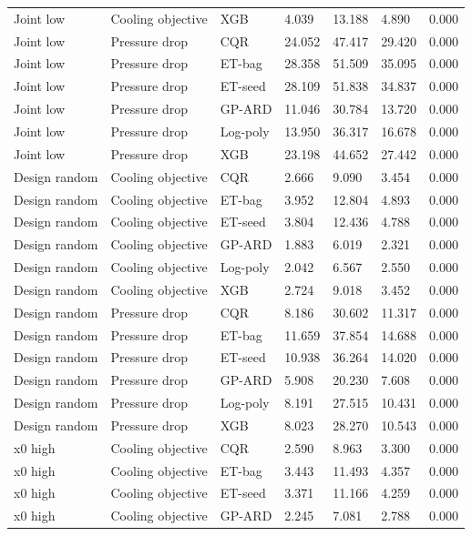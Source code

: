 \begin{longtable}{lllllll}
Joint low & Cooling objective & XGB & 4.039 & 13.188 & 4.890 & 0.000\\
Joint low & Pressure drop & CQR & 24.052 & 47.417 & 29.420 & 0.000\\
Joint low & Pressure drop & ET-bag & 28.358 & 51.509 & 35.095 & 0.000\\
Joint low & Pressure drop & ET-seed & 28.109 & 51.838 & 34.837 & 0.000\\
Joint low & Pressure drop & GP-ARD & 11.046 & 30.784 & 13.720 & 0.000\\
Joint low & Pressure drop & Log-poly & 13.950 & 36.317 & 16.678 & 0.000\\
Joint low & Pressure drop & XGB & 23.198 & 44.652 & 27.442 & 0.000\\
Design random & Cooling objective & CQR & 2.666 & 9.090 & 3.454 & 0.000\\
Design random & Cooling objective & ET-bag & 3.952 & 12.804 & 4.893 & 0.000\\
Design random & Cooling objective & ET-seed & 3.804 & 12.436 & 4.788 & 0.000\\
Design random & Cooling objective & GP-ARD & 1.883 & 6.019 & 2.321 & 0.000\\
Design random & Cooling objective & Log-poly & 2.042 & 6.567 & 2.550 & 0.000\\
Design random & Cooling objective & XGB & 2.724 & 9.018 & 3.452 & 0.000\\
Design random & Pressure drop & CQR & 8.186 & 30.602 & 11.317 & 0.000\\
Design random & Pressure drop & ET-bag & 11.659 & 37.854 & 14.688 & 0.000\\
Design random & Pressure drop & ET-seed & 10.938 & 36.264 & 14.020 & 0.000\\
Design random & Pressure drop & GP-ARD & 5.908 & 20.230 & 7.608 & 0.000\\
Design random & Pressure drop & Log-poly & 8.191 & 27.515 & 10.431 & 0.000\\
Design random & Pressure drop & XGB & 8.023 & 28.270 & 10.543 & 0.000\\
x0 high & Cooling objective & CQR & 2.590 & 8.963 & 3.300 & 0.000\\
x0 high & Cooling objective & ET-bag & 3.443 & 11.493 & 4.357 & 0.000\\
x0 high & Cooling objective & ET-seed & 3.371 & 11.166 & 4.259 & 0.000\\
x0 high & Cooling objective & GP-ARD & 2.245 & 7.081 & 2.788 & 0.000\\

\end{longtable}
